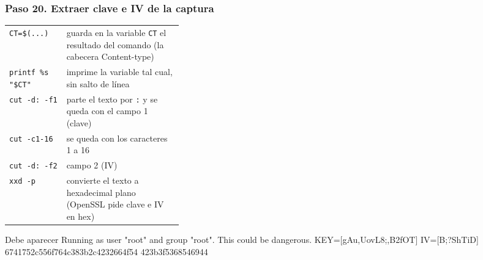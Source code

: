 \documentclass[11pt,a4paper]{article}
\begin{document}
\subsubsection*{Paso 20. Extraer clave e IV de la captura}
\begin{tcolorbox}[enhanced, breakable, colback=gray!3, colframe=gray!35, boxrule=0.3pt, arc=1pt, left=4pt, right=4pt, top=2pt, bottom=2pt, fonttitle=\sffamily\scriptsize\bfseries, coltitle=black!70, colbacktitle=gray!10, title={Qué hace cada parte}, attach title to upper, before skip=2pt, after skip=4pt, fontupper=\small]
\par{\renewcommand{\arraystretch}{1.12}\begin{tabularx}{\linewidth}{@{}>{\raggedright\arraybackslash}p{0.33\linewidth}>{\raggedright\arraybackslash}X@{}}
\texttt{CT=\allowbreak{}\$(...)} & guarda en la variable \texttt{CT} el resultado del comando (la cabecera Content-type) \\
\texttt{printf \%s "\$CT"} & imprime la variable tal cual, sin salto de línea \\
\texttt{cut -d: -f1} & parte el texto por \texttt{:} y se queda con el campo 1 (clave) \\
\texttt{cut -c1-16} & se queda con los caracteres 1 a 16 \\
\texttt{cut -d: -f2} & campo 2 (IV) \\
\texttt{xxd -p} & convierte el texto a hexadecimal plano (OpenSSL pide clave e IV en hex) \\
\end{tabularx}}
\end{tcolorbox}
\begin{salida}{Debe aparecer}
Running as user "root" and group "root". This could be dangerous.
KEY=[gAu,UovL8;,B2fOT]  IV=[B;?ShTiD]
6741752c556f764c383b2c4232664f54
423b3f5368546944
\end{salida}
\end{document}
